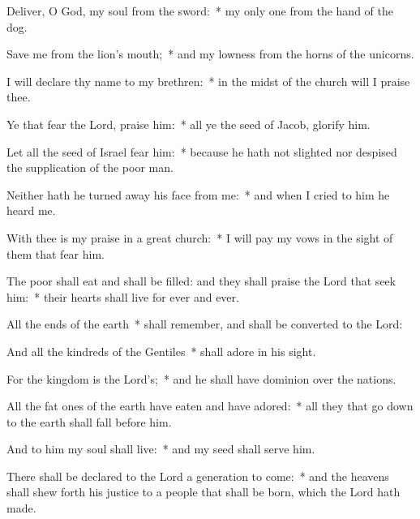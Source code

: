 \begin{enpars}
\item Deliver, O God, my soul from the sword:~* my only one from the hand of the dog.
\item Save me from the lion’s mouth;~* and my lowness from the horns of the unicorns.
\item I will declare thy name to my brethren:~* in the midst of the church will I praise thee.
\item Ye that fear the Lord, praise him:~* all ye the seed of Jacob, glorify him.
\item Let all the seed of Israel fear him:~* because he hath not slighted nor despised the supplication of the poor man.
\item Neither hath he turned away his face from me:~* and when I cried to him he heard me.
\item With thee is my praise in a great church:~* I will pay my vows in the sight of them that fear him.
\item The poor shall eat and shall be filled: and they shall praise the Lord that seek him:~* their hearts shall live for ever and ever.
\item All the ends of the earth~* shall remember, and shall be converted to the Lord:
\item And all the kindreds of the Gentiles~* shall adore in his sight.
\item For the kingdom is the Lord’s;~* and he shall have dominion over the nations.
\item All the fat ones of the earth have eaten and have adored:~* all they that go down to the earth shall fall before him.
\item And to him my soul shall live:~* and my seed shall serve him.
\item There shall be declared to the Lord a generation to come:~* and the heavens shall shew forth his justice to a people that shall be born, which the Lord hath made.
\end{enpars}